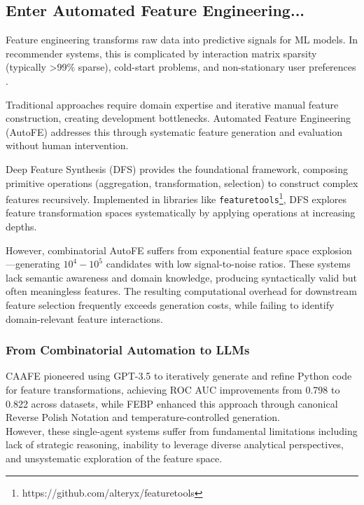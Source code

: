 \subsection{Enter Automated Feature Engineering...}

Feature engineering transforms raw data into predictive signals for ML models. In recommender systems, this is complicated by interaction matrix sparsity (typically >99\% sparse), cold-start problems, and non-stationary user preferences \cite{schein2002cold}.

Traditional approaches require domain expertise and iterative manual feature construction, creating development bottlenecks. Automated Feature Engineering (AutoFE) addresses this through systematic feature generation and evaluation without human intervention.

Deep Feature Synthesis (DFS) \cite{kanter2015deep} provides the foundational framework, composing primitive operations (aggregation, transformation, selection) to construct complex features recursively. Implemented in libraries like \texttt{featuretools}\footnote{https://github.com/alteryx/featuretools}, DFS explores feature transformation spaces systematically by applying operations at increasing depths.

However, combinatorial AutoFE suffers from exponential feature space explosion—generating \(10^4 -10^5\) candidates with low signal-to-noise ratios. These systems lack semantic awareness and domain knowledge, producing syntactically valid but often meaningless features. The resulting computational overhead for downstream feature selection frequently exceeds generation costs, while failing to identify domain-relevant feature interactions.


\subsubsection{From Combinatorial Automation to LLMs}

CAAFE \cite{hollmann2023caafe} pioneered using GPT-3.5 to iteratively generate and refine Python code for feature transformations, achieving ROC AUC improvements from 0.798 to 0.822 across datasets, while FEBP \cite{zou2025febp} enhanced this approach through canonical Reverse Polish Notation and temperature-controlled generation. \\

However, these single-agent systems suffer from fundamental limitations including lack of strategic reasoning, inability to leverage diverse analytical perspectives, and unsystematic exploration of the feature space.\\

